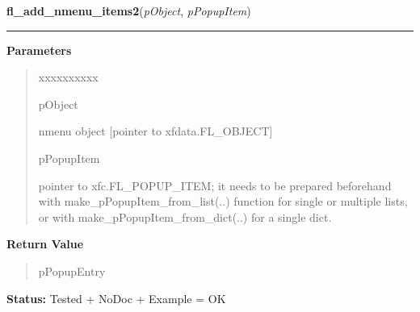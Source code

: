 \hspace{.8\funcindent}\begin{boxedminipage}{\funcwidth}

    \raggedright \textbf{fl\_add\_nmenu\_items2}(\textit{pObject}, \textit{pPopupItem})

    \vspace{-1.5ex}

    \rule{\textwidth}{0.5\fboxrule}
\setlength{\parskip}{2ex}
\setlength{\parskip}{1ex}
      \textbf{Parameters}
      \vspace{-1ex}

      \begin{quote}
        \begin{Ventry}{xxxxxxxxxx}

          \item[pObject]

          nmenu object [pointer to xfdata.FL\_OBJECT]

          \item[pPopupItem]

          pointer to xfc.FL\_POPUP\_ITEM; it needs to be prepared 
          beforehand with make\_pPopupItem\_from\_list(..) function for 
          single or multiple lists, or with 
          make\_pPopupItem\_from\_dict(..) for a single dict.

        \end{Ventry}

      \end{quote}

      \textbf{Return Value}
    \vspace{-1ex}

      \begin{quote}
      pPopupEntry

      \end{quote}

\textbf{Status:} Tested + NoDoc + Example = OK



    \end{boxedminipage}

    \label{xformslib:library:fl_insert_nmenu_items2}

    \vspace{0.5ex}

